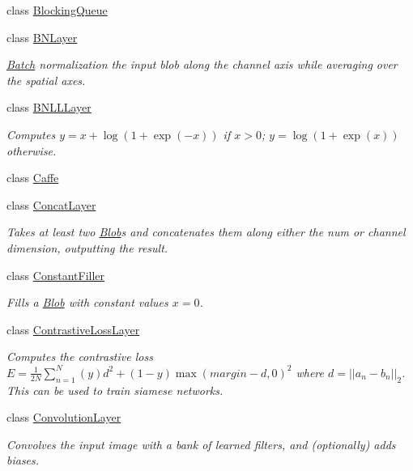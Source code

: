 \begin{DoxyCompactItemize}
class \hyperlink{classcaffe_1_1BlockingQueue}{Blocking\+Queue}
\item 
class \hyperlink{classcaffe_1_1BNLayer}{B\+N\+Layer}
\begin{DoxyCompactList}\small\item\em \hyperlink{classcaffe_1_1Batch}{Batch} normalization the input blob along the channel axis while averaging over the spatial axes. \end{DoxyCompactList}\item 
class \hyperlink{classcaffe_1_1BNLLLayer}{B\+N\+L\+L\+Layer}
\begin{DoxyCompactList}\small\item\em Computes $ y = x + \log(1 + \exp(-x)) $ if $ x > 0 $; $ y = \log(1 + \exp(x)) $ otherwise. \end{DoxyCompactList}\item 
class \hyperlink{classcaffe_1_1Caffe}{Caffe}
\item 
class \hyperlink{classcaffe_1_1ConcatLayer}{Concat\+Layer}
\begin{DoxyCompactList}\small\item\em Takes at least two \hyperlink{classcaffe_1_1Blob}{Blob}s and concatenates them along either the num or channel dimension, outputting the result. \end{DoxyCompactList}\item 
class \hyperlink{classcaffe_1_1ConstantFiller}{Constant\+Filler}
\begin{DoxyCompactList}\small\item\em Fills a \hyperlink{classcaffe_1_1Blob}{Blob} with constant values $ x = 0 $. \end{DoxyCompactList}\item 
class \hyperlink{classcaffe_1_1ContrastiveLossLayer}{Contrastive\+Loss\+Layer}
\begin{DoxyCompactList}\small\item\em Computes the contrastive loss $ E = \frac{1}{2N} \sum\limits_{n=1}^N \left(y\right) d^2 + \left(1-y\right) \max \left(margin-d, 0\right)^2 $ where $ d = \left| \left| a_n - b_n \right| \right|_2 $. This can be used to train siamese networks. \end{DoxyCompactList}\item 
class \hyperlink{classcaffe_1_1ConvolutionLayer}{Convolution\+Layer}
\begin{DoxyCompactList}\small\item\em Convolves the input image with a bank of learned filters, and (optionally) adds biases. \end{DoxyCompactList}\item 

\end{DoxyCompactItemize}
